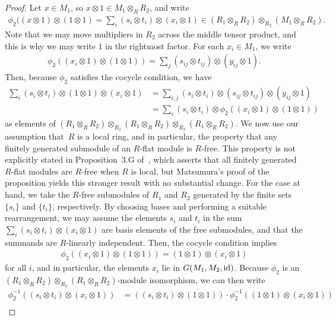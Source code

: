 \documentclass[pdftex]{sigma}
\theoremstyle{definition}
\begin{document}
\begin{proof}
Let $x \in M_1$, so $x \otimes 1 \in M_1 \otimes_{R} R_2$, and write
\begin{gather*} \phi_2((x \otimes 1) \otimes (1 \otimes 1) = \sum_i (s_i \otimes t_i) \otimes (x_i \otimes 1) \in (R_1 \otimes_{R} R_2) \otimes_{R_2} (M_1 \otimes_{R} R_2). \end{gather*}
Note that we may move multipliers in $R_2$ across the middle tensor product, and this is why we may write $1$ in the rightmost factor. For each $x_i \in M_1$, we write
\begin{gather*} \phi_2((x_i \otimes 1) \otimes (1 \otimes 1)) = \sum_j (s_{ij} \otimes t_{ij}) \otimes (y_{ij} \otimes 1). \end{gather*}
Then, because $\phi_2$ satisfies the cocycle condition, we have
 \begin{align*} \sum_i (s_i \otimes t_i) \otimes (1 \otimes 1) \otimes (x_i \otimes 1) &= \sum_{i,j} (s_i \otimes t_i) \otimes (s_{ij} \otimes t_{ij}) \otimes (y_{ij} \otimes 1) \\
&= \sum_i (s_i \otimes t_i) \otimes \phi_2((x_i \otimes 1) \otimes (1 \otimes 1))
\end{align*}
as elements of $(R_1 \otimes_{R} R_2) \otimes_{R_2}(R_1 \otimes_{R} R_2) \otimes_{R_2}(R_1 \otimes_{R} R_2)$. We now use our assumption that~$R$ is a local ring, and in particular, the property that any finitely generated submodule of an $R$-flat module is $R$-free. This property is not explicitly stated in Proposition~3.G of~\cite{M80}, which asserts that all finitely generated $R$-flat modules are $R$-free when $R$ is local, but Matsumura's proof of the proposition yields this stronger result with no substantial change. For the case at hand, we take the $R$-free submodules of $R_1$ and $R_2$ generated by the finite sets $\{ s_i\}$ and $\{t_i\}$, respectively. By choosing bases and performing a suitable rearrangement, we may assume the elements $s_i$ and $t_i$ in the sum $\sum_i (s_i \otimes t_i) \otimes (x_i \otimes 1)$ are basis elements of the free submodules, and that the summands are $R$-linearly independent. Then, the cocycle condition implies
\begin{gather*} \phi_2((x_i \otimes 1) \otimes (1 \otimes 1)) = (1 \otimes 1) \otimes (x_i \otimes 1) \end{gather*}
for all $i$, and in particular, the elements $x_i$ lie in $G(M_1,M_2,{\rm id})$. Because $\phi_2$ is an $(R_1 \otimes_{R} R_2) \otimes_{R_2} (R_1 \otimes_{R} R_2)$-module isomorphism, we can then write
\begin{align*}
\phi_2^{-1}((s_i \otimes t_i) \otimes (x_i \otimes 1)) &= ((s_i \otimes t_i) \otimes (1 \otimes 1))\cdot \phi_2^{-1}((1 \otimes 1) \otimes (x_i \otimes 1)) \\

\end{align*}
\end{proof}
\end{document}
